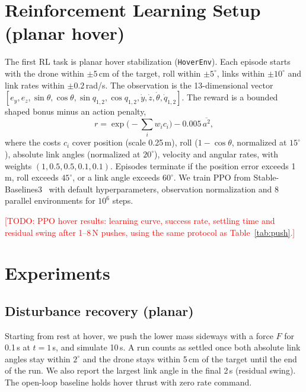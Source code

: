 \documentclass{article}
\newcommand{\todo}[1]{\textcolor{red}{[TODO: #1]}}
\begin{document}
\section{Reinforcement Learning Setup (planar hover)}
\label{sec:rl}
The first RL task is planar hover stabilization (\texttt{HoverEnv}). Each episode
starts with the drone within $\pm5$\,cm of the target, roll within $\pm5^\circ$, links
within $\pm10^\circ$ and link rates within $\pm0.2$\,rad/s. The observation is the
13-dimensional vector
$[e_y, e_z, \sin\theta, \cos\theta, \sin q_{1,2}, \cos q_{1,2}, \dot y, \dot z,
\dot\theta, \dot q_{1,2}]$. The reward is a bounded shaped bonus minus an action
penalty,
\begin{equation}
  r = \exp\Big(-\textstyle\sum_i w_i c_i\Big) - 0.005\,\overline{a^2},
\end{equation}
where the costs $c_i$ cover position (scale 0.25\,m), roll
($1-\cos\theta$, normalized at $15^\circ$), absolute link angles (normalized at
$20^\circ$), velocity and angular rates, with weights $(1, 0.5, 0.5, 0.1, 0.1)$.
Episodes terminate if the position error exceeds 1\,m, roll exceeds $45^\circ$, or a
link angle exceeds $60^\circ$. We train PPO from Stable-Baselines3~\citep{raffin2021sb3}
with default hyperparameters, observation normalization and 8 parallel environments
for $10^6$ steps.

\todo{PPO hover results: learning curve, success rate, settling time and residual
swing after 1--8\,N pushes, using the same protocol as Table~\ref{tab:push}.}

\section{Experiments}
\label{sec:experiments}

\subsection{Disturbance recovery (planar)}
\label{sec:exp_push}
Starting from rest at hover, we push the lower mass sideways with a force $F$ for
0.1\,s at $t = 1$\,s, and simulate 10\,s. A run counts as settled once both absolute
link angles stay within $2^\circ$ and the drone stays within 5\,cm of the target until
the end of the run. We also report the largest link angle in the final 2\,s
(residual swing). The open-loop baseline holds hover thrust with zero rate command.
\end{document}
